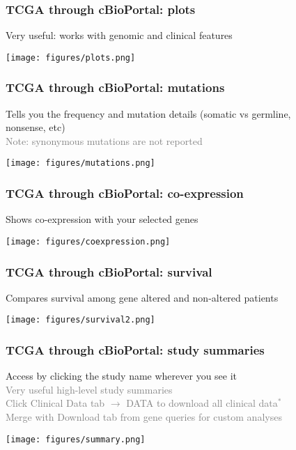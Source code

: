 \documentclass{beamer}
\newcommand{\si}[1]{\hspace{.5cm} \textcolor{gray} {#1}\\}
\begin{document}
{\begin{frame}[t]
\frametitle{TCGA through cBioPortal: plots}
Very useful: works with genomic and clinical features\\
\begin{center}
\texttt{[image: figures/plots.png]}
\end{center}
\end{frame}

\begin{frame}[t]
\frametitle{TCGA through cBioPortal: mutations}
Tells you the frequency and mutation details (somatic vs germline,\\
\hspace{.5cm} nonsense, etc)\\
\si{Note: synonymous mutations are not reported}
\begin{center}
\texttt{[image: figures/mutations.png]}
\end{center}
\end{frame}

\begin{frame}[t]
\frametitle{TCGA through cBioPortal: co-expression}
Shows co-expression with your selected genes\\
\begin{center}
\texttt{[image: figures/coexpression.png]}
\end{center}
\end{frame}

\begin{frame}[t]
\frametitle{TCGA through cBioPortal: survival}
Compares survival among gene altered and non-altered patients\\
\begin{center}
\texttt{[image: figures/survival2.png]}
\end{center}
\end{frame}

\begin{frame}[t]
\frametitle{TCGA through cBioPortal: study summaries}
Access by clicking the study name wherever you see it\\
\si{Very useful high-level study summaries}
\si{Click Clinical Data tab $\rightarrow$ DATA to download all clinical data$^*$}
\si{Merge with Download tab from gene queries for custom analyses}
\begin{center}
\texttt{[image: figures/summary.png]}
\end{center}
\end{frame}

}
\end{document}
